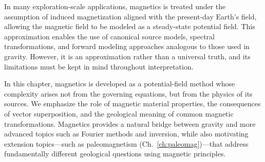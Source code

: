In many exploration-scale applications, magnetics is treated under the assumption of induced magnetization aligned with the present-day Earth's field, allowing the magnetic field to be modeled as a steady-state potential field. This approximation enables the use of canonical source models, spectral transformations, and forward modeling approaches analogous to those used in gravity. However, it is an approximation rather than a universal truth, and its limitations must be kept in mind throughout interpretation.

In this chapter, magnetics is developed as a potential-field method whose complexity arises not from the governing equations, but from the physics of its sources. We emphasize the role of magnetic material properties, the consequences of vector superposition, and the geological meaning of common magnetic transformations. Magnetics provides a natural bridge between gravity and more advanced topics such as Fourier methods and inversion, while also motivating extension topics---such as paleomagnetism (Ch.~\ref{ch:paleomag})---that address fundamentally different geological questions using magnetic principles.

